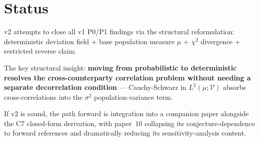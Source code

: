 \documentclass{article}
\begin{document}
\section{Status}

v2 attempts to close all v1 P0/P1 findings via the structural
reformulation: deterministic deviation field + base population
measure $\mu$ + $\chi^2$ divergence + restricted reverse claim.

The key structural insight: \textbf{moving from probabilistic to
deterministic resolves the cross-counterparty correlation problem
without needing a separate decorrelation condition} ---
Cauchy-Schwarz in $L^2(\mu; \mathcal{V})$ absorbs cross-correlations
into the $\sigma^2$ population-variance term.

If v2 is sound, the path forward is integration into a companion
paper alongside the C7 closed-form derivation, with paper~10
collapsing its conjecture-dependence to forward references and
dramatically reducing its sensitivity-analysis content.
\end{document}
